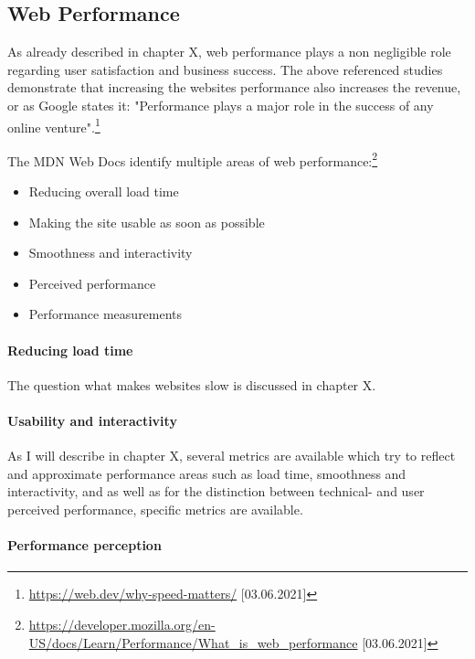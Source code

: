 






\subsection{Web Performance}



As already described in chapter X, web performance plays a non negligible role regarding user satisfaction and business success.
The above referenced studies demonstrate that increasing the websites performance also increases the revenue, or as Google states it: "Performance plays a major role in the success of any online venture".\footnote{\url{https://web.dev/why-speed-matters/} [03.06.2021]}

The MDN Web Docs identify multiple areas of web performance:\footnote{\url{https://developer.mozilla.org/en-US/docs/Learn/Performance/What_is_web_performance} [03.06.2021]}
\begin{itemize}
\item Reducing overall load time
\item Making the site usable as soon as possible
\item Smoothness and interactivity
\item Perceived performance
\item Performance measurements
\end{itemize}

\paragraph{Reducing load time} The question what makes websites slow is discussed in chapter X.

\paragraph{Usability and interactivity} As I will describe in chapter X, several metrics are available which try to reflect and approximate performance areas such as load time, smoothness and interactivity, and as well as for the distinction between technical- and user perceived performance, specific metrics are available.


\paragraph{Performance perception}

